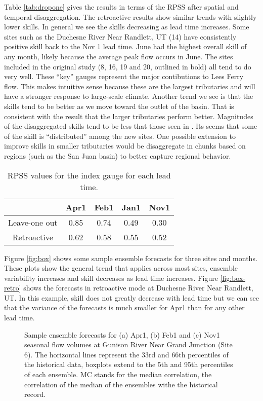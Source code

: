\documentclass[final,5p,times,twocolumn,authoryear]{elsarticle}
\begin{document}
Table \ref{tab:dropone} gives the results in terms of the RPSS after spatial and temporal disaggregation. The retroactive results show similar trends with slightly lower skills. In general we see the skills decreasing as lead time increases. Some sites such as the Duchesne River Near Randlett, UT (14) have consistently positive skill back to the Nov 1 lead time. June had the highest overall skill of any month, likely because the average peak flow occurs in June. The sites included in the original study (8, 16, 19 and 20, outlined in bold) all tend to do very well.  These ``key'' gauges represent the major contibutions to Lees Ferry flow. This makes intuitive sense because these are the largest tributaries and will have a stronger response to large-scale climate. Another trend we see is that the skills tend to be better as we move toward the outlet of the basin. That is consistent with the result that the larger tributaries perform better. Magnitudes of the disaggregated skills tend to be less that those seen in \cite{Bracken:2010cw}. Its seems that some of the skill is ``distributed'' among the new sites.   One possible extension to improve skills in smaller tributaries would be disaggregate in chunks based on regions (such as the San Juan basin) to better capture regional behavior.

\begin{table}[ht]
\centering
\caption{RPSS values for the index gauge for each lead time.}\label{tab:indexskill}
\begin{tabular}{ccccc} 
\toprule
& Apr1 & Feb1 & Jan1 & Nov1 \\
\midrule
Leave-one out & 0.85 & 0.74 & 0.49 & 0.30 \\
Retroactive   & 0.62 & 0.58 & 0.55 & 0.52\\
\bottomrule
\end{tabular}
\end{table}

{\small

}
 
Figure \ref{fig:box} shows some sample ensemble forecasts for three sites and months. These plots show the general trend that applies across most sites, ensemble variability increases and skill decreases as lead time increases. Figure \ref{fig:box-retro} shows the forecasts in retroactive mode at Duchesne River Near Randlett, UT. In this example, skill does not greatly decrease with lead time but we can see that the variance of the forecasts is much smaller for Apr1 than for any other lead time.   

\begin{figure*}[htbp] %
   \centering
   
   \caption{Sample ensemble forecasts for (a) Apr1, (b) Feb1 and (c) Nov1 seasonal flow volumes at Gunison River Near Grand Junction (Site 6). The horizontal lines represent the 33rd and 66th percentiles of the historical data, boxplots extend to the 5th and 95th percentiles of each ensemble. MC stands for the median correlation, the correlation of the median of the ensembles withe the historical record.}
   \label{fig:box-seas}
\end{figure*}
\end{document}
